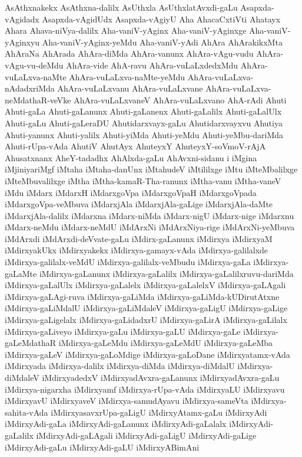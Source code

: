 {AsAthxnakekx
AsAthxna-dalilx
AsUthxla
AsUthxlatAvxdi-gaLu
Asapxda-vAgidadx
Asapxda-vAgidUdx
Asapxda-vAgiyU
Aha
AhacaCxtiVti
Ahatayx
Ahara
Ahava-niVya-dalilx
Aha-vaniV-yAginx
Aha-vaniV-yAginxge
Aha-vaniV-yAginxyu
Aha-vaniV-yAginx-yeMdu
Aha-vaniV-yAdi
AhAra
AhArakikxMta
AhAraNa
AhArada
AhAra-diMda
AhAra-vanunx
AhAra-vAgu-vudu
AhAra-vAgu-vu-deMdu
AhAra-vide
AhA-ravu
AhAra-vuLaLxdedxMdu
AhAra-vuLaLxva-naMte
AhAra-vuLaLxva-naMte-yeMdu
AhAra-vuLaLxva-nAdadxriMda
AhAra-vuLaLxvanu
AhAra-vuLaLxvane
AhAra-vuLaLxva-neMdathaR-veVke
AhAra-vuLaLxvaneV
AhAra-vuLaLxvano
AhA-rAdi
Ahuti
Ahuti-gaLa
Ahuti-gaLanunx
Ahuti-gaLanenx
Ahuti-gaLalilx
Ahuti-gaLalUlx
Ahuti-gaLu
Ahuti-gaLeraDU
Ahutidarxvayx-gaLu
Ahutidarxvayxvu
Ahutiya
Ahuti-yanunx
Ahuti-yalilx
Ahuti-yiMda
Ahuti-yeMdu
Ahuti-yeMbu-dariMda
Ahuti-rUpa-vAda
AhutiV
AhutAyx
AhuteyxY
AhuteyxY-soVmoV-rAjA
Ahusatxnanx
AheY-tadadhx
AhAlxda-gaLu
AhAvxni-sidanu
i
iMgina
iMjiniyariMgf
iMtaha
iMtaha-danUnx
iMtahudeV
iMtililxge
iMtu
iMteMbalilxge
iMteMbuvalilxge
iMtha
iMtha-kamaR-Tha-ranunx
iMtha-vanu
iMtha-vaneV
iMdu
iMdarx
iMdarxH
iMdarxgoVpa
iMdarxgoVpaH
iMdarxgoVpada
iMdarxgoVpa-veMbuva
iMdarxjAla
iMdarxjAla-gaLige
iMdarxjAla-daMte
iMdarxjAla-dalilx
iMdarxna
iMdarx-niMda
iMdarx-nigU
iMdarx-nige
iMdarxnu
iMdarx-neMdu
iMdarx-neMdU
iMdArxNi
iMdArxNiya-rige
iMdArxNi-yeMbuva
iMdArxdi
iMdArxdi-deVvate-gaLu
iMdirx-gaLanunx
iMdirxya
iMdirxyaM
iMdirxyakUkx
iMdirxyakekx
iMdirxya-gamayx-vAda
iMdirxya-galilalxde
iMdirxya-galilalx-veMdU
iMdirxya-galilalx-veMbudu
iMdirxya-gaLa
iMdirxya-gaLaMte
iMdirxya-gaLanunx
iMdirxya-gaLalilx
iMdirxya-gaLalilxruvu-dariMda
iMdirxya-gaLalUlx
iMdirxya-gaLalelx
iMdirxya-gaLalelxV
iMdirxya-gaLAgali
iMdirxya-gaLAgi-ruva
iMdirxya-gaLiMda
iMdirxya-gaLiMda-kUDirutAtxne
iMdirxya-gaLiMdalU
iMdirxya-gaLiMdaleV
iMdirxya-gaLigU
iMdirxya-gaLige
iMdirxya-gaLigelalx
iMdirxya-gaLidadxrU
iMdirxya-gaLirA
iMdirxya-gaLilalx
iMdirxya-gaLiveyo
iMdirxya-gaLu
iMdirxya-gaLU
iMdirxya-gaLe
iMdirxya-gaLeMdathaR
iMdirxya-gaLeMdu
iMdirxya-gaLeMdU
iMdirxya-gaLeMba
iMdirxya-gaLeV
iMdirxya-gaLoMdige
iMdirxya-gaLoDane
iMdirxyatamx-vAda
iMdirxyada
iMdirxya-dalilx
iMdirxya-diMda
iMdirxya-diMdalU
iMdirxya-diMdaleV
iMdirxyadedxV
iMdirxyadAvxra-gaLanunx
iMdirxyadAvxra-gaLu
iMdirxya-nigarxha
iMdirxyamf
iMdirxya-rUpa-vAda
iMdirxyaLU
iMdirxyavu
iMdirxyavU
iMdirxyaveV
iMdirxya-samudAyavu
iMdirxya-sameVta
iMdirxya-sahita-vAda
iMdirxyasavxrUpa-gaLigU
iMdirxyAtamx-gaLu
iMdirxyAdi
iMdirxyAdi-gaLa
iMdirxyAdi-gaLanunx
iMdirxyAdi-gaLalalx
iMdirxyAdi-gaLalilx
iMdirxyAdi-gaLAgali
iMdirxyAdi-gaLigU
iMdirxyAdi-gaLige
iMdirxyAdi-gaLu
iMdirxyAdi-gaLU
iMdirxyABimAni
}
